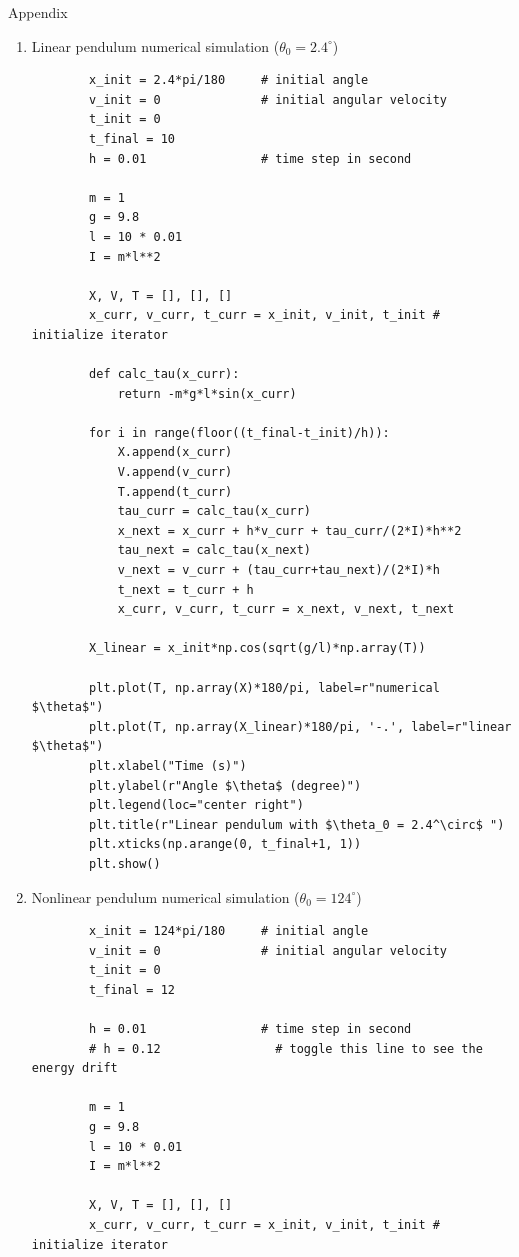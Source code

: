 \documentclass{article}
\begin{document}
\newpage
\begin{section*}{Appendix}
	\begin{enumerate}[1.]
		\item \label{linear_py} Linear pendulum numerical simulation ($\theta_0 = 2.4^\circ$)
		\begin{verbatim}
		x_init = 2.4*pi/180     # initial angle
		v_init = 0              # initial angular velocity
		t_init = 0
		t_final = 10
		h = 0.01                # time step in second
		
		m = 1
		g = 9.8
		l = 10 * 0.01
		I = m*l**2
		
		X, V, T = [], [], []    
		x_curr, v_curr, t_curr = x_init, v_init, t_init # initialize iterator
		
		def calc_tau(x_curr):
			return -m*g*l*sin(x_curr)
		
		for i in range(floor((t_final-t_init)/h)):
			X.append(x_curr)
			V.append(v_curr)
			T.append(t_curr)
			tau_curr = calc_tau(x_curr)
			x_next = x_curr + h*v_curr + tau_curr/(2*I)*h**2
			tau_next = calc_tau(x_next)
			v_next = v_curr + (tau_curr+tau_next)/(2*I)*h
			t_next = t_curr + h
			x_curr, v_curr, t_curr = x_next, v_next, t_next
		
		X_linear = x_init*np.cos(sqrt(g/l)*np.array(T))
		
		plt.plot(T, np.array(X)*180/pi, label=r"numerical $\theta$")
		plt.plot(T, np.array(X_linear)*180/pi, '-.', label=r"linear $\theta$")
		plt.xlabel("Time (s)")
		plt.ylabel(r"Angle $\theta$ (degree)")
		plt.legend(loc="center right")
		plt.title(r"Linear pendulum with $\theta_0 = 2.4^\circ$ ")
		plt.xticks(np.arange(0, t_final+1, 1))
		plt.show()
		\end{verbatim}

		\newpage
		\item \label{nonlinear_py} Nonlinear pendulum numerical simulation ($\theta_0 = 124^\circ$)
		\begin{verbatim}
		x_init = 124*pi/180     # initial angle
		v_init = 0              # initial angular velocity
		t_init = 0
		t_final = 12
		
		h = 0.01                # time step in second
		# h = 0.12                # toggle this line to see the energy drift
		
		m = 1
		g = 9.8
		l = 10 * 0.01
		I = m*l**2
		
		X, V, T = [], [], []    
		x_curr, v_curr, t_curr = x_init, v_init, t_init # initialize iterator
		

\end{verbatim}
\end{enumerate}
\end{section*}
\end{document}
